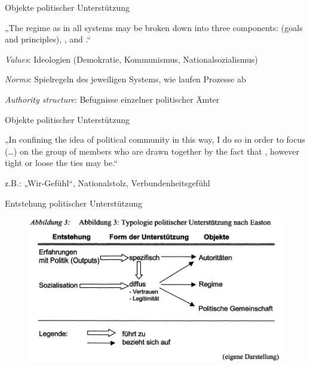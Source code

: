 \documentclass[11pt]{beamer}
\begin{document}
\begin{frame}[t]{Objekte politischer Unterstützung}
 \\ \pause

„The regime as  in all systems may be broken down into three components:  (goals and principles), , and .“ \parencite[193]{Easton1965}\\ \pause

\textit{Values}: Ideologien (Demokratie, Kommunismus, Nationalsozialismus) \\ \pause

\textit{Norms}: Spielregeln des jeweiligen Systems, wie laufen Prozesse ab \\ \pause

\textit{Authority structure}: Befugnisse einzelner politischer Ämter \\ \pause
\end{frame}

\begin{frame}[t]{Objekte politischer Unterstützung}
 \\ \pause

„In confining the idea of political community in this way, I do so in order to focus (…) on the group of members who are drawn together by the fact that , however tight or loose the ties may be.“ \parencite[178]{Easton1965} \\ \pause

z.B.: „Wir-Gefühl“, Nationalstolz, Verbundenheitsgefühl 

\end{frame}

\begin{frame}{Entstehung politischer Unterstützung}
	\begin{figure}[ht]
		\includegraphics[width=\textwidth]{pics/s2-8.png}
		\caption{\cite[45]{Fuhse2005}}
	\end{figure}
\end{frame}
\end{document}

